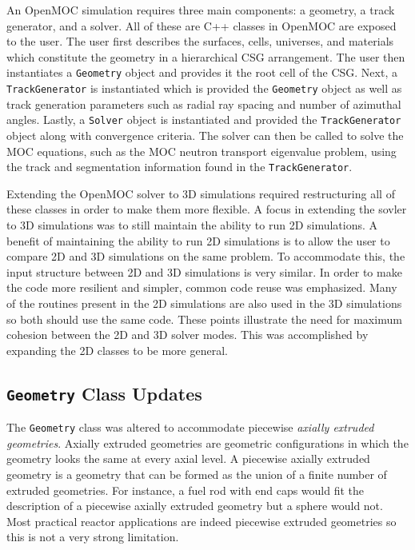 An OpenMOC simulation requires three main components: a geometry, a track generator, and a solver. All of these are C++ classes in OpenMOC are exposed to the user. The user first describes the surfaces, cells, universes, and materials which constitute the geometry in a hierarchical \ac{CSG} arrangement. The user then instantiates a \texttt{Geometry} object and provides it the root cell of the \ac{CSG}. Next, a \texttt{TrackGenerator} is instantiated which is provided the \texttt{Geometry} object as well as track generation parameters such as radial ray spacing and number of azimuthal angles. Lastly, a \texttt{Solver} object is instantiated and provided the \texttt{TrackGenerator} object along with convergence criteria. The solver can then be called to solve the \ac{MOC} equations, such as the \ac{MOC} neutron transport eigenvalue problem, using the track and segmentation information found in the \texttt{TrackGenerator}.

Extending the OpenMOC solver to 3D simulations required restructuring all of these classes in order to make them more flexible. A focus in extending the sovler to 3D simulations was to still maintain the ability to run 2D simulations. A benefit of maintaining the ability to run 2D simulations is to allow the user to compare 2D and 3D simulations on the same problem. To accommodate this, the input structure between 2D and 3D simulations is very similar. In order to make the code more resilient and simpler, common code reuse was emphasized. Many of the routines present in the 2D simulations are also used in the 3D simulations so both should use the same code. These points illustrate the need for maximum cohesion between the 2D and 3D solver modes. This was accomplished by expanding the 2D classes to be more general.

\subsection{\texttt{Geometry} Class Updates}
\label{sec:oo-geometry}

The \texttt{Geometry} class was altered to accommodate piecewise \textit{axially extruded geometries}. Axially extruded geometries are geometric configurations in which the geometry looks the same at every axial level. A piecewise axially extruded geometry is a geometry that can be formed as the union of a finite number of extruded geometries. For instance, a fuel rod with end caps would fit the description of a piecewise axially extruded geometry but a sphere would not. Most practical reactor applications are indeed piecewise extruded geometries so this is not a very strong limitation. 


